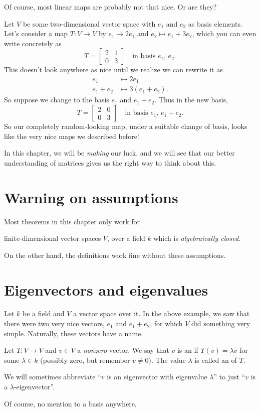 Of course, most linear maps are probably not that nice.
Or are they?
\begin{example}
	Let $V$ be some two-dimensional vector space
	with $e_1$ and $e_2$ as basis elements.
	Let's consider a map $T \colon V \to V$
	by $e_1 \mapsto 2e_1$ and $e_2 \mapsto e_1+3e_2$,
	which you can even write concretely as
	\[ T = \begin{bmatrix}
		2 & 1 \\
		0 & 3
	\end{bmatrix} \quad\text{in basis $e_1$, $e_2$}. \]
	This doesn't look anywhere as nice until we realize we can rewrite it as
	\begin{align*}
		e_1 &\mapsto 2e_1 \\
		e_1+e_2 &\mapsto 3(e_1+e_2).
	\end{align*}
	So suppose we change to the basis $e_1$ and $e_1 + e_2$.
	Thus in the new basis,
	\[ T = \begin{bmatrix}
		2 & 0 \\
		0 & 3
	\end{bmatrix} \quad\text{in basis $e_1$, $e_1+e_2$}. \]
	So our completely random-looking map,
	under a suitable change of basis,
	looks like the very nice maps we described before!
\end{example}
In this chapter, we will be \emph{making} our luck,
and we will see that our better understanding of matrices
gives us the right way to think about this.

\section{Warning on assumptions}
Most theorems in this chapter only work for
\begin{itemize}
	\ii finite-dimensional vector spaces $V$,
	\ii over a field $k$ which is \emph{algebraically closed}.
\end{itemize}
On the other hand, the definitions work fine without
these assumptions.

\section{Eigenvectors and eigenvalues}
Let $k$ be a field and $V$ a vector space over it.
In the above example, we saw that there were two very nice
vectors, $e_1$ and $e_1+e_2$, for which $V$ did something very simple.
Naturally, these vectors have a name.
\begin{definition}
	Let $T \colon V \to V$ and $v \in V$ a \emph{nonzero} vector.
	We say that $v$ is an  if $T(v) = \lambda v$
	for some $\lambda \in k$ (possibly zero, but remember $v \neq 0$).
	The value $\lambda$ is called an  of $T$.

	We will sometimes abbreviate
	``$v$ is an eigenvector with eigenvalue $\lambda$''
	to just ``$v$ is a $\lambda$-eigenvector''.
\end{definition}
Of course, no mention to a basis anywhere.

